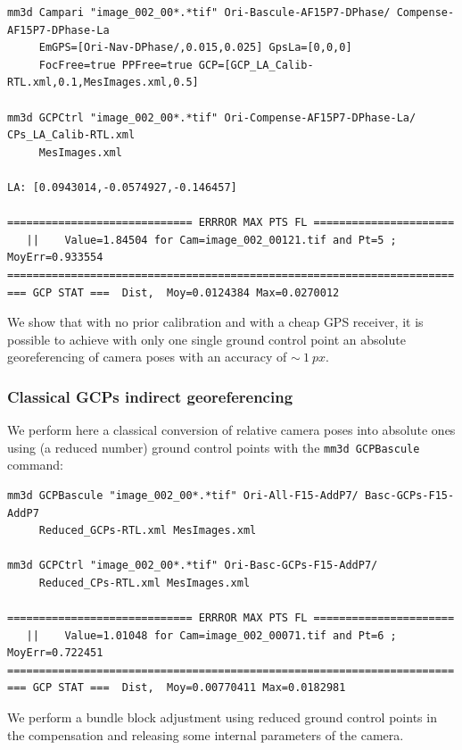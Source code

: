 \begin{verbatim}
mm3d Campari "image_002_00*.*tif" Ori-Bascule-AF15P7-DPhase/ Compense-AF15P7-DPhase-La 
     EmGPS=[Ori-Nav-DPhase/,0.015,0.025] GpsLa=[0,0,0] 
     FocFree=true PPFree=true GCP=[GCP_LA_Calib-RTL.xml,0.1,MesImages.xml,0.5]
     
mm3d GCPCtrl "image_002_00*.*tif" Ori-Compense-AF15P7-DPhase-La/ CPs_LA_Calib-RTL.xml
     MesImages.xml

LA: [0.0943014,-0.0574927,-0.146457]

============================= ERRROR MAX PTS FL ======================
   ||    Value=1.84504 for Cam=image_002_00121.tif and Pt=5 ; MoyErr=0.933554
======================================================================
=== GCP STAT ===  Dist,  Moy=0.0124384 Max=0.0270012
\end{verbatim}



We show that with no prior calibration and with a cheap GPS receiver, it is possible to achieve with only one single ground control point an absolute georeferencing of camera poses with an accuracy of $\sim\ 1\ px$.
\subsubsection{Classical GCPs indirect georeferencing}
We perform here a classical conversion of relative camera poses into absolute ones using (a reduced number) ground control points with the {\tt mm3d GCPBascule} command:

\begin{verbatim}
mm3d GCPBascule "image_002_00*.*tif" Ori-All-F15-AddP7/ Basc-GCPs-F15-AddP7 
     Reduced_GCPs-RTL.xml MesImages.xml
     
mm3d GCPCtrl "image_002_00*.*tif" Ori-Basc-GCPs-F15-AddP7/ 
     Reduced_CPs-RTL.xml MesImages.xml

============================= ERRROR MAX PTS FL ======================
   ||    Value=1.01048 for Cam=image_002_00071.tif and Pt=6 ; MoyErr=0.722451
======================================================================
=== GCP STAT ===  Dist,  Moy=0.00770411 Max=0.0182981
\end{verbatim}


We perform a bundle block adjustment using reduced ground control points in the compensation and releasing some internal parameters of the camera.

